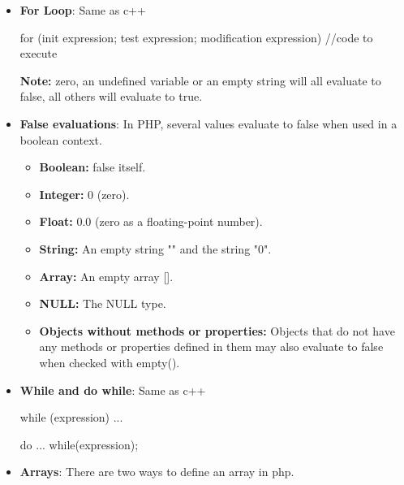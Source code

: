 \documentclass{report}
\begin{document}
\begin{itemize}
\begin{bashcode}
{                        ...
                        break;
                }
            \end{bashcode}
        \item \textbf{For Loop}: Same as c++
            \bigbreak \noindent 
            \begin{bashcode}
                for (init expression; test expression; modification expression) {
                    //code to execute
                }
            \end{bashcode}
            \bigbreak \noindent 
            \textbf{Note:} zero, an undefined variable or an empty string will all evaluate to false, all others will evaluate to true.
        \item \textbf{False evaluations}: In PHP, several values evaluate to false when used in a boolean context. 
            \begin{itemize}
                \item \textbf{Boolean:} false itself.
                \item \textbf{Integer:} 0 (zero).
                \item \textbf{Float:} 0.0 (zero as a floating-point number).
                \item \textbf{String:} An empty string "" and the string "0".
                \item \textbf{Array:} An empty array [].
                \item \textbf{NULL:} The NULL type.
                \item \textbf{Objects without methods or properties:} Objects that do not have any methods or properties defined in them may also evaluate to false when checked with empty().
            \end{itemize}
        \item \textbf{While and do while}: Same as c++
            \bigbreak \noindent 
            \begin{bashcode}
                while (expression) {
                    ...
                }

                do {
                    ...
                } while(expression);
            \end{bashcode}
        \item \textbf{Arrays}: There are two ways to define an array in php.
            \bigbreak \noindent 
\end{itemize}
\end{document}

